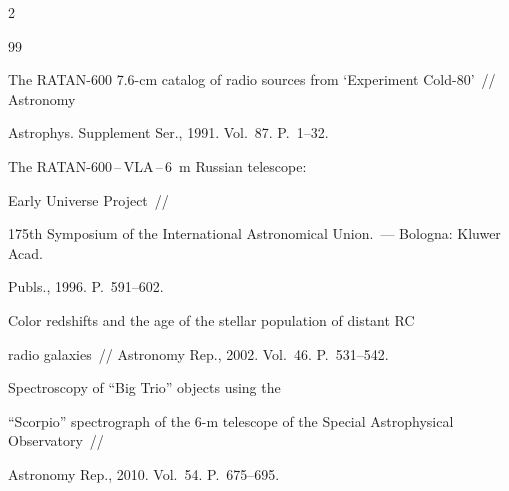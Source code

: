 \begin{multicols}{2}
     

{\small\frenchspacing

{%


\begin{thebibliography}{99}








The  RATAN-600 7.6-cm catalog of radio sources from `Experiment Cold-80'~// Astronomy 

Astrophys. Supplement Ser., 1991. Vol.~87. P.~1--32.


 The RATAN-600\,--\,VLA\,--\,6~m Russian telescope: 

Early Universe Project~// 

175th Symposium of the International Astronomical Union.~---  Bologna: Kluwer Acad. 

Publs., 1996. P.~591--602.


 Color  redshifts and the age of the stellar population of distant RC 

radio galaxies~// Astronomy  Rep., 2002. Vol.~46. P.~531--542.



Spectroscopy of ``Big Trio'' objects using the 

``Scorpio'' spectrograph of the 6-m telescope of the Special Astrophysical Observatory~// 

Astronomy Rep., 2010. Vol.~54. P.~675--695.


\end{thebibliography}}}
\end{multicols}

